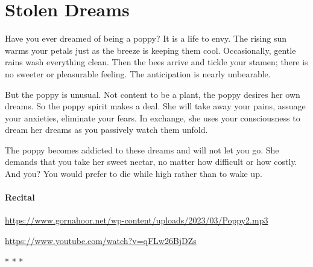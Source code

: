 \section{Stolen Dreams}

Have you ever dreamed of being a poppy? It is a life to envy. The rising sun warms your petals just as the breeze is keeping them cool. Occasionally, gentle rains wash everything clean. Then the bees arrive and tickle your stamen; there is no sweeter or pleasurable feeling. The anticipation is nearly unbearable.

But the poppy is unusual. Not content to be a plant, the poppy desires her own dreams. So the poppy spirit makes a deal. She will take away your pains, assuage your anxieties, eliminate your fears. In exchange, she uses your consciousness to dream her dreams as you passively watch them unfold.

The poppy becomes addicted to these dreams and will not let you go. She demands that you take her sweet nectar, no matter how difficult or how costly. And you? You would prefer to die while high rather than to wake up.

\paragraph{Recital}

\url{https://www.gornahoor.net/wp-content/uploads/2023/03/Poppy2.mp3}

\url{https://www.youtube.com/watch?v=qFLw26BjDZs}


\begin{center}* * *\end{center}

